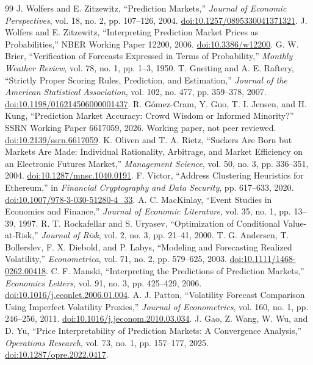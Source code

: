 \begin{thebibliography}{99}
 J. Wolfers and E. Zitzewitz, ``Prediction Markets,'' \textit{Journal of Economic Perspectives}, vol. 18, no. 2, pp. 107--126, 2004. \href{https://doi.org/10.1257/0895330041371321}{doi:10.1257/0895330041371321}.
 J. Wolfers and E. Zitzewitz, ``Interpreting Prediction Market Prices as Probabilities,'' NBER Working Paper 12200, 2006. \href{https://doi.org/10.3386/w12200}{doi:10.3386/w12200}.
 G. W. Brier, ``Verification of Forecasts Expressed in Terms of Probability,'' \textit{Monthly Weather Review}, vol. 78, no. 1, pp. 1--3, 1950.
 T. Gneiting and A. E. Raftery, ``Strictly Proper Scoring Rules, Prediction, and Estimation,'' \textit{Journal of the American Statistical Association}, vol. 102, no. 477, pp. 359--378, 2007. \href{https://doi.org/10.1198/016214506000001437}{doi:10.1198/016214506000001437}.
 R. G\'omez-Cram, Y. Guo, T. I. Jensen, and H. Kung, ``Prediction Market Accuracy: Crowd Wisdom or Informed Minority?'' SSRN Working Paper 6617059, 2026. Working paper, not peer reviewed. \href{https://doi.org/10.2139/ssrn.6617059}{doi:10.2139/ssrn.6617059}.
 K. Oliven and T. A. Rietz, ``Suckers Are Born but Markets Are Made: Individual Rationality, Arbitrage, and Market Efficiency on an Electronic Futures Market,'' \textit{Management Science}, vol. 50, no. 3, pp. 336--351, 2004. \href{https://doi.org/10.1287/mnsc.1040.0191}{doi:10.1287/mnsc.1040.0191}.
 F. Victor, ``Address Clustering Heuristics for Ethereum,'' in \textit{Financial Cryptography and Data Security}, pp. 617--633, 2020. \href{https://doi.org/10.1007/978-3-030-51280-4_33}{doi:10.1007/978-3-030-51280-4\_33}.
 A. C. MacKinlay, ``Event Studies in Economics and Finance,'' \textit{Journal of Economic Literature}, vol. 35, no. 1, pp. 13--39, 1997.
 R. T. Rockafellar and S. Uryasev, ``Optimization of Conditional Value-at-Risk,'' \textit{Journal of Risk}, vol. 2, no. 3, pp. 21--41, 2000.
 T. G. Andersen, T. Bollerslev, F. X. Diebold, and P. Labys, ``Modeling and Forecasting Realized Volatility,'' \textit{Econometrica}, vol. 71, no. 2, pp. 579--625, 2003. \href{https://doi.org/10.1111/1468-0262.00418}{doi:10.1111/1468-0262.00418}.
 C. F. Manski, ``Interpreting the Predictions of Prediction Markets,'' \textit{Economics Letters}, vol. 91, no. 3, pp. 425--429, 2006. \href{https://doi.org/10.1016/j.econlet.2006.01.004}{doi:10.1016/j.econlet.2006.01.004}.
 A. J. Patton, ``Volatility Forecast Comparison Using Imperfect Volatility Proxies,'' \textit{Journal of Econometrics}, vol. 160, no. 1, pp. 246--256, 2011. \href{https://doi.org/10.1016/j.jeconom.2010.03.034}{doi:10.1016/j.jeconom.2010.03.034}.
 J. Gao, Z. Wang, W. Wu, and D. Yu, ``Price Interpretability of Prediction Markets: A Convergence Analysis,'' \textit{Operations Research}, vol. 73, no. 1, pp. 157--177, 2025. \href{https://doi.org/10.1287/opre.2022.0417}{doi:10.1287/opre.2022.0417}.


\end{thebibliography}
\clearpage
